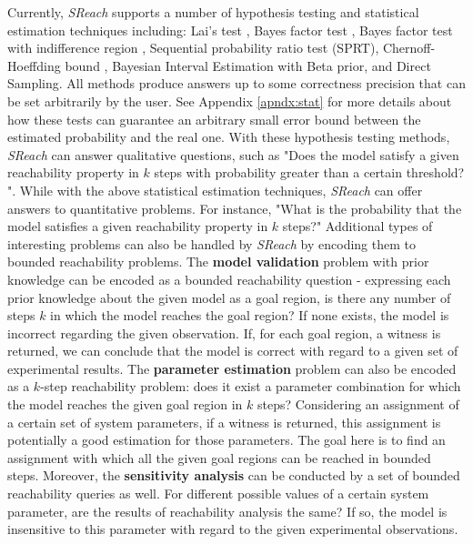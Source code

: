 Currently, {\it SReach} supports a number of hypothesis testing and statistical estimation techniques including: {Lai's test} \cite{lai1988nearly}, {Bayes factor test} \cite{kass1995bayes}, {Bayes factor test with indifference region} \cite{younes2005verification}, {Sequential probability ratio test (SPRT)}\cite{wald1945sequential}, {Chernoff-Hoeffding bound} \cite{hoeffding1963probability}, {Bayesian Interval Estimation with Beta prior}\cite{zuliani2010bayesian}, and {Direct Sampling}. All methods produce answers up to some correctness precision that can be set arbitrarily by the user. See Appendix \ref{apndx:stat} for more details about how these tests can guarantee an arbitrary small error bound between the estimated probability and the real one. With these hypothesis testing methods, {\it SReach} can answer qualitative questions, such as "Does the model satisfy a given reachability property in $k$ steps with probability greater than a certain threshold? ". While with the above statistical estimation techniques, {\it SReach} can offer answers to quantitative problems. For instance, "What is the probability that the model satisfies a given reachability property in $k$ steps?" Additional types of interesting problems can also be handled by {\it SReach} by encoding them to bounded reachability problems. The {\bf model validation} problem with prior knowledge can be encoded as a bounded reachability question - expressing each prior knowledge about the given model as a goal region, is there any number of steps $k$ in which the model reaches the goal region? If none exists, the model is incorrect regarding the given observation. If, for each goal region, a witness is returned, we can conclude that the model is correct with regard to a given set of experimental results. The {\bf parameter estimation} problem can also be encoded as a $k$-step reachability problem: does it exist a parameter combination for which the model reaches the given goal region in $k$ steps? Considering an assignment of a certain set of system parameters, if a witness is returned, this assignment is potentially a good estimation for those parameters. The goal here is to find an assignment with which all the given goal regions can be reached in bounded steps. Moreover, the {\bf sensitivity analysis} can be conducted by a set of bounded reachability queries as well. For different possible values of a certain system parameter, are the results of reachability analysis the same? If so, the model is insensitive to this parameter with regard to the given experimental observations.


